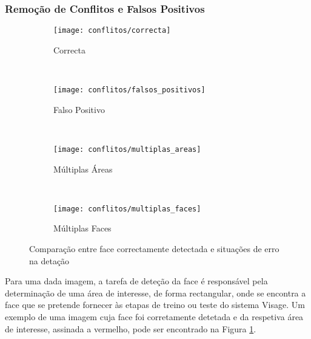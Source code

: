 \subsubsection*{Remoção de Conflitos e Falsos Positivos}

\begin{figure}[t]
        \centering
        \begin{subfigure}[b]{0.2\textwidth}
                \centering
                \texttt{[image: conflitos/correcta]}
                \caption{Correcta}
                \label{fig:conflitos-correcta}
        \end{subfigure}%
        ~ 
        \begin{subfigure}[b]{0.2\textwidth}
                \centering
                \texttt{[image: conflitos/falsos\_positivos]}
                \caption{Falso Positivo}
                \label{fig:conflitos-falsos_positivos}
        \end{subfigure}
        ~ 
        \begin{subfigure}[b]{0.2\textwidth}
                \centering
                \texttt{[image: conflitos/multiplas\_areas]}
                \caption{Múltiplas Áreas}
                \label{fig:conflitos-multiplas_areas}
        \end{subfigure}
        ~ 
        \begin{subfigure}[b]{0.2\textwidth}
                \centering
                \texttt{[image: conflitos/multiplas\_faces]}
                \caption{Múltiplas Faces}
                \label{fig:conflitos-multiplas_faces}
        \end{subfigure}
        \caption{Comparação entre face correctamente detectada e situações de erro na detação}\label{fig:conflitos-detecao}
\end{figure}

Para uma dada imagem, a tarefa de deteção da face é responsável pela determinação de uma área de interesse, de forma rectangular, onde se encontra a face que se pretende fornecer às etapas de treino ou teste do sistema Visage. Um exemplo de uma imagem cuja face foi corretamente detetada e da respetiva área de interesse, assinada a vermelho, pode ser encontrado na Figura \ref{fig:conflitos-correcta}.

